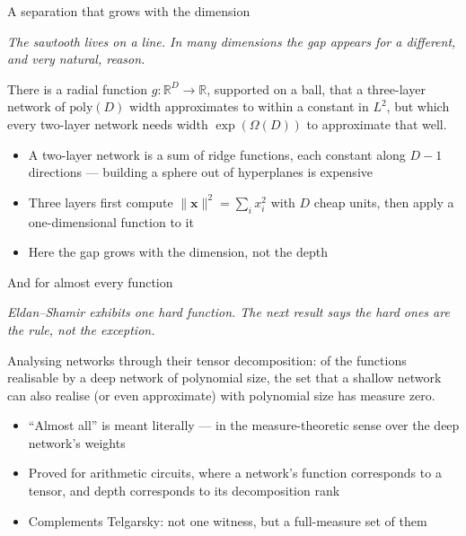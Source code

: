 \documentclass[aspectratio=169, 11pt]{beamer}
\newcommand{\bridge}[1]{%
  {\scriptsize\itshape\color{mcMuted} #1\par}\vspace{0.35em}}
\newcommand{\src}[3]{}      %
\begin{document}
\begin{frame}{A separation that grows with the dimension}
  \src{eldan2016}{section}{1}
  \bridge{The sawtooth lives on a line. In many dimensions the gap
  appears for a different, and very natural, reason.}
  \vspace{0.3em}
  \begin{theorem}
    {\small There is a \alert{radial} function
    $g:\mathbb{R}^{D}\to\mathbb{R}$, supported on a ball, that a
    \alert{three-layer} network of $\mathrm{poly}(D)$ width approximates
    to within a constant in $L^{2}$, but which \alert{every two-layer}
    network needs width $\exp(\Omega(D))$ to approximate that well.}
  \end{theorem}
  \vspace{0.3em}
  {\small
  \begin{itemize}\setlength{\itemsep}{1pt}
    \item A two-layer network is a sum of \alert{ridge} functions, each
          constant along $D-1$ directions --- building a sphere out of
          hyperplanes is expensive
    \item Three layers first compute
          $\lVert\mathbf{x}\rVert^{2}=\sum_i x_i^{2}$ with $D$ cheap
          units, then apply a one-dimensional function to it
    \item Here the gap grows with the \alert{dimension}, not the depth
  \end{itemize}}
\end{frame}

\begin{frame}{And for almost every function}
  \src{cohen2016b}{section}{4}
  \bridge{Eldan--Shamir exhibits one hard function. The next result says
  the hard ones are the rule, not the exception.}
  \vspace{0.3em}
  \begin{theorem}
    {\small Analysing networks through their \alert{tensor
    decomposition}: of the functions realisable by a deep network of
    polynomial size, the set that a shallow network can also realise
    (or even approximate) with polynomial size has
    \alert{measure zero}.}
  \end{theorem}
  \vspace{0.4em}
  {\small
  \begin{itemize}\setlength{\itemsep}{1pt}
    \item ``Almost all'' is meant literally --- in the measure-theoretic
          sense over the deep network's weights
    \item Proved for arithmetic circuits, where a network's function
          corresponds to a \alert{tensor}, and depth corresponds to its
          decomposition rank
    \item Complements Telgarsky: not one witness, but a full-measure
          set of them
  \end{itemize}}
\end{frame}
\end{document}
